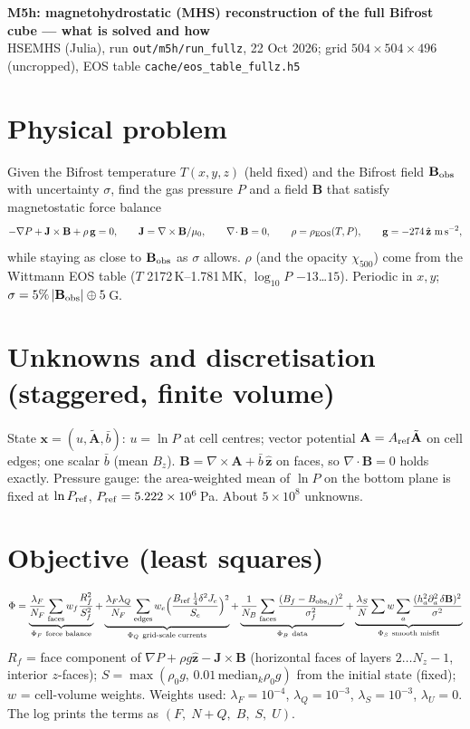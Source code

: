 \documentclass[9pt]{extarticle}
\begin{document}
{\large\bfseries M5h: magnetohydrostatic (MHS) reconstruction of the full Bifrost cube --- what is solved and how}\\
{\small HSEMHS (Julia), run \texttt{out/m5h/run\_fullz}, 22 Oct 2026; grid $504\times504\times496$ (uncropped), EOS table \texttt{cache/eos\_table\_fullz.h5}}

\section{Physical problem}
Given the Bifrost temperature $T(x,y,z)$ (held fixed) and the Bifrost field $\mathbf B_{\rm obs}$ with uncertainty $\sigma$, find the gas pressure $P$ and a field $\mathbf B$ that satisfy magnetostatic force balance
\[
-\nabla P+\mathbf J\times\mathbf B+\rho\,\mathbf g=0,\qquad \mathbf J=\nabla\times\mathbf B/\mu_0,\qquad \nabla\!\cdot\mathbf B=0,\qquad \rho=\rho_{\rm EOS}(T,P),\qquad \mathbf g=-274\,\hat{\mathbf z}\ \mathrm{m\,s^{-2}},
\]
while staying as close to $\mathbf B_{\rm obs}$ as $\sigma$ allows. $\rho$ (and the opacity $\chi_{500}$) come from the Wittmann EOS table ($T$ 2172\,K--1.781\,MK, $\log_{10}P$ $-13$\ldots$15$). Periodic in $x,y$; $\sigma=5\%\,|\mathbf B_{\rm obs}|\oplus5$\,G.

\section{Unknowns and discretisation (staggered, finite volume)}
State $\mathbf x=(u,\tilde{\mathbf A},\bar b)$: $u=\ln P$ at cell centres; vector potential $\mathbf A=A_{\rm ref}\tilde{\mathbf A}$ on cell edges; one scalar $\bar b$ (mean $B_z$). $\mathbf B=\nabla\times\mathbf A+\bar b\,\hat{\mathbf z}$ on faces, so $\nabla\!\cdot\mathbf B=0$ holds exactly. Pressure gauge: the area-weighted mean of $\ln P$ on the bottom plane is fixed at $\ln P_{\rm ref}$, $P_{\rm ref}=5.222\times10^{6}$\,Pa. About $5\times10^{8}$ unknowns.

\section{Objective (least squares)}
\[
\Phi=\underbrace{\frac{\lambda_F}{N_F}\sum_{\rm faces} w_f\frac{R_f^2}{S_f^2}}_{\Phi_F\ \text{force balance}}
+\underbrace{\frac{\lambda_F\lambda_Q}{N_F}\sum_{\rm edges} w_e\Big(\frac{B_{\rm ref}\,\tfrac14\delta^2 J_e}{S_e}\Big)^{2}}_{\Phi_Q\ \text{grid-scale currents}}
+\underbrace{\frac{1}{N_B}\sum_{\rm faces}\frac{(B_f-B_{{\rm obs},f})^2}{\sigma_f^2}}_{\Phi_B\ \text{data}}
+\underbrace{\frac{\lambda_S}{N}\sum w\sum_a\frac{(h_a^2\partial_a^2\,\delta\mathbf B)^2}{\sigma^2}}_{\Phi_S\ \text{smooth misfit}}
\]
$R_f$ = face component of $\nabla P+\rho g\hat{\mathbf z}-\mathbf J\times\mathbf B$ (horizontal faces of layers $2\ldots N_z{-}1$, interior $z$-faces); $S=\max(\rho_0 g,\,0.01\,\mathrm{median}_k\rho_0 g)$ from the initial state (fixed); $w$ = cell-volume weights. Weights used: $\lambda_F=10^{-4}$, $\lambda_Q=10^{-3}$, $\lambda_S=10^{-3}$, $\lambda_U=0$. The log prints the terms as $(F,\;N{+}Q,\;B,\;S,\;U)$.
\end{document}
